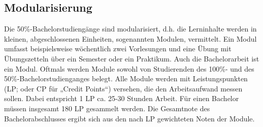 %
%
%
%
%
%


\subsection{Modularisierung}

Die 50\%-Bachelorstudiengänge sind modularisiert, d.h. die Lerninhalte werden
in kleinen, abgeschlossenen Einheiten, sogenannten Modulen, vermittelt. Ein
Modul umfasst beispielsweise wöchentlich zwei Vorlesungen und eine Übung mit
Übungszetteln über ein Semester oder ein Praktikum. Auch die Bachelorarbeit ist
ein Modul. Oftmals werden Module sowohl von Studierenden des 100\%- und des
50\%-Bachelorstudienganges belegt. Alle Module werden mit Leistungspunkten (LP;
oder CP für „Credit Points“) versehen, die den Arbeitsaufwand messen sollen.
Dabei entspricht 1 LP ca. 25-30 Stunden Arbeit. Für einen Bachelor müssen
insgesamt 180 LP gesammelt werden. Die Gesamtnote des Bachelorabschlusses
ergibt sich aus den nach LP gewichteten Noten der Module.


